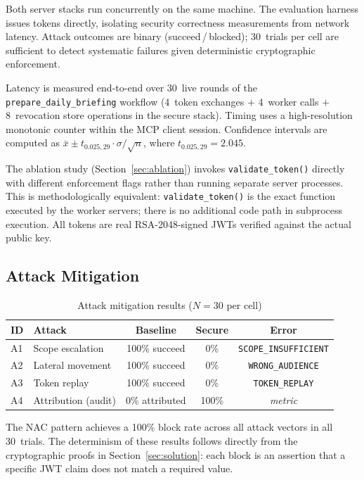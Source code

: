 \documentclass[journal]{IEEEtran}
\begin{document}
Both server stacks run concurrently on the same machine. The evaluation harness
issues tokens directly, isolating security correctness measurements from network
latency. Attack outcomes are binary (succeed\,/\,blocked); 30~trials per cell
are sufficient to detect systematic failures given deterministic cryptographic
enforcement.

Latency is measured end-to-end over 30~live rounds of the
\texttt{prepare\_daily\_briefing} workflow (4~token exchanges $+$ 4~worker
calls $+$ 8~revocation store operations in the secure stack). Timing uses a
high-resolution monotonic counter within the MCP client session. Confidence
intervals are computed as $\bar{x} \pm t_{0.025,29}\cdot\sigma/\sqrt{n}$,
where $t_{0.025,29} = 2.045$.

The ablation study (Section~\ref{sec:ablation}) invokes \texttt{validate\_token()}
directly with different enforcement flags rather than running separate server
processes. This is methodologically equivalent: \texttt{validate\_token()} is
the exact function executed by the worker servers; there is no additional code
path in subprocess execution. All tokens are real RSA-2048-signed JWTs verified
against the actual public key.

\subsection{Attack Mitigation}

\begin{table}[h]
\caption{Attack mitigation results ($N=30$ per cell)}
\label{tab:attacks}
\centering
\footnotesize
\setlength{\tabcolsep}{4pt}
\begin{tabular}{llccc}
\toprule
\textbf{ID} & \textbf{Attack} & \textbf{Baseline} & \textbf{Secure} & \textbf{Error} \\
\midrule
A1 & Scope escalation    & 100\% succeed & 0\%  & \texttt{SCOPE\_INSUFFICIENT} \\
A2 & Lateral movement    & 100\% succeed & 0\%  & \texttt{WRONG\_AUDIENCE} \\
A3 & Token replay        & 100\% succeed & 0\%  & \texttt{TOKEN\_REPLAY} \\
A4 & Attribution (audit) & 0\% attributed & 100\% & \textit{metric} \\
\bottomrule
\end{tabular}
\end{table}

The NAC pattern achieves a 100\% block rate across all attack vectors in all
30~trials. The determinism of these results follows directly from the
cryptographic proofs in Section~\ref{sec:solution}: each block is an assertion
that a specific JWT claim does not match a required value.
\end{document}
